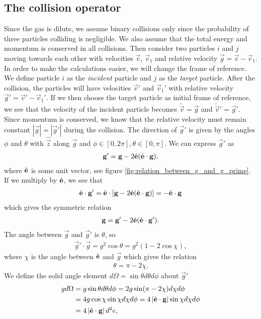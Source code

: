 \subsection{The collision operator}
Since the gas is dilute, we assume binary collisions only since the probability of three particles colliding is negligible. We also assume that the total energy and momentum is conserved in all collisions. Then consider two particles $i$ and $j$ moving towards each other with velocities $\vec v$, $\vec v_1$ and relative velocity $\vec g = \vec v - \vec v_1$. In order to make the calculations easier, we will change the frame of reference. We define particle $i$ as the \textit{incident} particle and $j$ as the \textit{target} particle. After the collision, the particles will have velocities $\vec v'$ and $\vec v_1'$ with relative velocity $\vec g' = \vec v' - \vec v_1'$. If we then choose the target particle as initial frame of reference, we see that the velocity of the incident particle becomes $\tilde {\vec v} = \vec g$ and $\tilde {\vec v}' = \vec g'$. Since momentum is conserved, we know that the relative velocity must remain constant $|\vec g| = |\vec g'|$ during the collision. The direction of $\vec g'$ is given by the angles $\phi$ and $\theta$ with $\hat {\vec z}$ along $\vec g$ and $\phi \in [0, 2\pi], \theta \in [0, \pi]$. We can express $\vec g'$ as
\begin{align}
	\mathbf g' = \mathbf g - 2\hat {\mathbf{e}}(\hat {\mathbf{e}}\cdot\mathbf g),
\end{align}
where $\hat {\mathbf{e}}$ is some unit vector, see figure \ref{fig:relation_between_g_and_g_prime}. If we multiply by $\hat {\mathbf{e}}$, we see that 
\begin{align}
	\hat {\mathbf{e}}\cdot \mathbf g' = \hat {\mathbf{e}}\cdot\left[\mathbf g - 2\hat {\mathbf{e}}(\hat {\mathbf{e}}\cdot\mathbf g)\right] = -\hat {\mathbf{e}} \cdot \mathbf g
\end{align}
which gives the symmetric relation
\begin{align}
	\mathbf g = \mathbf g' - 2\hat {\mathbf{e}}(\hat {\mathbf{e}}\cdot\mathbf g').
\end{align}
The angle between $\vec g$ and $\vec g'$ is $\theta$, so
\begin{align}
	\vec g'\cdot \vec g = g^2\cos\theta = g^2(1 - 2\cos \chi),
\end{align}
where $\chi$ is the angle between $\hat {\mathbf{e}}$ and $\vec g$ which gives the relation
\begin{align}
	\theta = \pi - 2\chi.
\end{align}
We define the solid angle element $d\Omega=\sin\theta d\theta d\phi$ about $\vec g'$ 
\begin{align}
	g d\Omega &= g\sin\theta d\theta d\phi = 2g\sin(\pi - 2\chi)d\chi d\phi\\
	&= 4g\cos\chi\sin\chi d\chi d\phi = 4\left|\hat {\mathbf{e}}\cdot\mathbf g\right|\sin\chi d\chi d\phi\\
	&= 4\left|\hat {\mathbf{e}}\cdot\mathbf g\right|d^2e,
\end{align}
